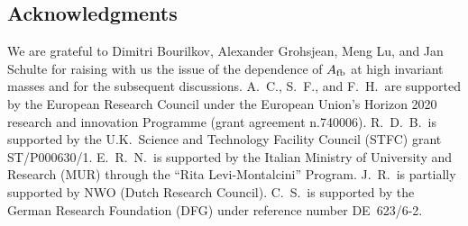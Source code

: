 \subsection*{Acknowledgments}

We are grateful to Dimitri Bourilkov, Alexander Grohsjean, Meng Lu, and Jan Schulte for raising with us the issue of the
\pdf dependence of $A_{\rm fb}$ at high invariant masses and for the subsequent discussions.
%
A.~C., S.~F., and F.~H.\ are supported by
the European Research Council under 
the European Union's Horizon 2020 research and innovation Programme
(grant agreement n.740006).
%
R.~D.~B.\ is supported by the U.K.\
Science and Technology Facility Council (STFC) grant ST/P000630/1.
%
E.~R.~N.\ is supported by the Italian Ministry of University and Research (MUR)
through the ``Rita Levi-Montalcini'' Program.
%
J.~R.\ is partially supported by NWO (Dutch Research Council).
%
C.~S.\ is supported by the German Research Foundation (DFG) under
reference number DE~623/6-2.
